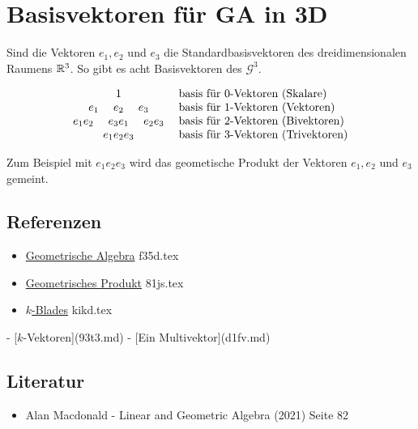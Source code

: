 \documentclass{sajzk}
\begin{document}
\section{Basisvektoren für GA in 3D}
\label{fw8i}

Sind die Vektoren $e_1, e_2$ und $e_3$ die Standardbasisvektoren des
dreidimensionalen Raumens $\mathbb{R}^3$. So gibt es acht Basisvektoren des
$\mathscr{G}^3$.

\[
\begin{matrix}
    1 \\ 
    e_1\hspace{3ex} e_2\hspace{3ex} e_3 \\ 
    e_1e_2\hspace{3ex} e_3e_1\hspace{3ex} e_2e_3 \\
    e_1e_2e_3
\end{matrix}
\hspace{3ex}
\begin{matrix*}[l]
    \textrm{basis für }0\textrm{-Vektoren (Skalare)} \\ 
    \textrm{basis für }1\textrm{-Vektoren (Vektoren)} \\ 
    \textrm{basis für }2\textrm{-Vektoren (Bivektoren)} \\ 
    \textrm{basis für }3\textrm{-Vektoren (Trivektoren)} \\ 
\end{matrix*}
\]

Zum Beispiel mit $e_1e_2e_3$ wird das geometische Produkt der Vektoren $e_1, e_2$
und $e_3$ gemeint.

\subsection{Referenzen}
\begin{itemize}
    \item \href{f35d.pdf}{Geometrische Algebra} f35d.tex
    \item \href{81js.pdf}{Geometrisches Produkt} 81js.tex
    \item \href{kikd.pdf}{$k$-Blades} kikd.tex
\end{itemize}

- [$k$-Vektoren](93t3.md)
- [Ein Multivektor](d1fv.md)

\subsection{Literatur}
\begin{itemize}
    \item Alan Macdonald - Linear and Geometric Algebra (2021) Seite 82
\end{itemize}
\end{document}
